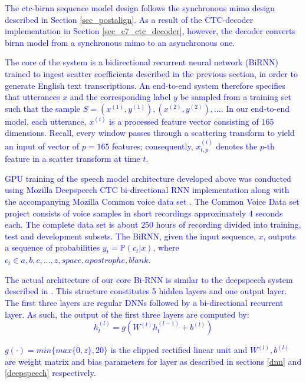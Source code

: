 \textcolor{blue}{The \acrshort{ctc}-\acrshort{birnn} sequence model design follows the synchronous \acrshort{mimo} design described in Section \ref{sec_postalign}. As a result of the CTC-decoder implementation in Section \ref{sec_c7_ctc_decoder}, however, the decoder converts \acrshort{birnn} model from a synchronous \acrshort{mimo} to an asynchronous one.

The core of the system is a bidirectional recurrent neural network (BiRNN) trained to ingest scatter coefficients described in the previous section, in order to generate English text transcriptions.  An end-to-end system therefore specifies that utterances $x$ and the corresponding label $y$ be sampled from a training set such that the sample $S = {(x^{(1)}, y^{(1)}), (x^{(2)}, y^{(2)}), . . .}$.   In our end-to-end model, each utterance, $x^{(i)}$ is a processed feature vector consisting of $165$ dimensions.  Recall, every window passes through a scattering transform to yield an input of vector of $p=165$ features; consequently,   $x^{(i)}_{t,p}$ denotes the $p$-th feature in a scatter transform at time $t$.  

GPU training of the speech model architecture developed above was conducted using Mozilla Deepspeech \citep{mozilla_2019} CTC bi-directional RNN implementation along with the accompanying Mozilla Common voice data set  \citep{ardila2019common}.  The Common Voice Data set project consists of voice samples in short recordings approximately $4$ seconds each.  The complete data set is about $250$ hours of recording divided into training, test and development subsets.  The BiRNN, given the input sequence, $x$, outputs a sequence of probabilities $y_t=\mathbb{P}(c_t|x)$,  where $c_t \in a,b,c,\dots,z,space,apostrophe,blank$. 

The actual architecture of our core Bi-RNN is similar to the deepspeech system described in \cite{hannun2014deep}. This structure constitutes 5 hidden layers and one output layer.  The first three layers are regular DNNs followed by a bi-directional recurrent layer. As such, the output of the first three layers are computed by:
\begin{equation}
    h^{(l)}_t = g(W^{(l)} h^{(l−1)}_t + b^{(l)})\label{ch06_01_l1-3}
\end{equation}

$g(\cdot) = min\{max\{0,z\},20\}$  is the clipped rectified linear unit and $W^{(l)},b^{(l)}$ are weight matrix and bias parameters for layer  as described in sections \ref{dnn} and \ref{deepspeech} respectively.

}
